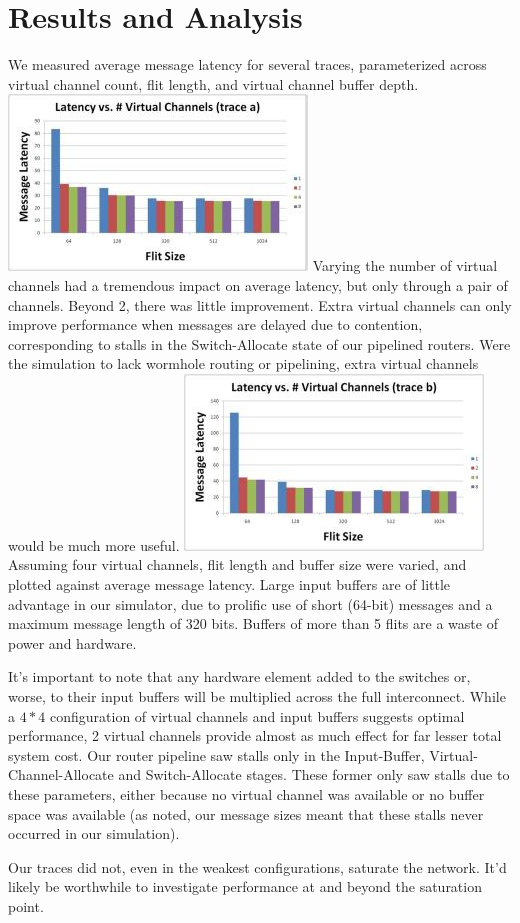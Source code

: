 \documentclass[twocolumn]{article}
\begin{document}
\section{Results and Analysis}
We measured average message latency for several traces, parameterized across
virtual channel count, flit length, and virtual channel buffer depth.
\includegraphics{images/trace_avc_small}
Varying the number of virtual channels had a tremendous impact on average
latency, but only through a pair of channels. Beyond 2, there was little
improvement. Extra virtual channels can only improve performance when messages
are delayed due to contention, corresponding to stalls in the Switch-Allocate
state of our pipelined routers. Were the simulation to lack wormhole routing
or pipelining, extra virtual channels would be much more useful.
\includegraphics{images/trace_bvc_small}
\newpage
Assuming four virtual channels, flit length and buffer size were varied, and
plotted against average message latency.
Large input buffers are of little advantage in our simulator, due to prolific
use of short (64-bit) messages and a maximum message length of 320 bits. Buffers
of more than 5 flits are a waste of power and hardware.

It's important to note that any hardware element added to the switches or,
worse, to their input buffers will be multiplied across the full interconnect.
While a $4*4$ configuration of virtual channels and input buffers suggests
optimal performance, 2 virtual channels provide almost as much effect for far
lesser total system cost. Our router pipeline saw stalls only in the
Input-Buffer, Virtual-Channel-Allocate and Switch-Allocate stages. These former
only saw stalls due to these parameters, either because no virtual channel was
available or no buffer space was available (as noted, our message sizes meant
that these stalls never occurred in our simulation).

Our traces did not, even in the weakest configurations, saturate the network. It'd
likely be worthwhile to investigate performance at and beyond the saturation point.
\end{document}
